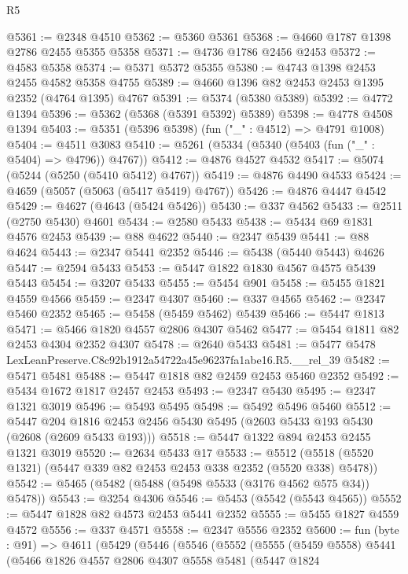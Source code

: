 \begin{lexlean}{R5}
\begin{coremodule}
@5361 := @2348 @4510
@5362 := @5360 @5361
@5368 := @4660 @1787 @1398 @2786 @2455 @5355 @5358
@5371 := @4736 @1786 @2456 @2453
@5372 := @4583 @5358
@5374 := @5371 @5372 @5355
@5380 := @4743 @1398 @2453 @2455 @4582 @5358 @4755
@5389 := @4660 @1396 @82 @2453 @2453 @1395 @2352 (@4764 @1395) @4767
@5391 := @5374 (@5380 @5389)
@5392 := @4772 @1394
@5396 := @5362 (@5368 (@5391 @5392) @5389)
@5398 := @4778 @4508 @1394
@5403 := @5351 (@5396 @5398) (fun ("_" : @4512) => @4791 @1008)
@5404 := @4511 @3083
@5410 := @5261 (@5334 (@5340 (@5403 (fun ("_" : @5404) => @4796)) @4767))
@5412 := @4876 @4527 @4532
@5417 := @5074 (@5244 (@5250 (@5410 @5412) @4767))
@5419 := @4876 @4490 @4533
@5424 := @4659 (@5057 (@5063 (@5417 @5419) @4767))
@5426 := @4876 @4447 @4542
@5429 := @4627 (@4643 (@5424 @5426))
@5430 := @337 @4562
@5433 := @2511 (@2750 @5430) @4601
@5434 := @2580 @5433
@5438 := @5434 @69 @1831 @4576 @2453
@5439 := @88 @4622
@5440 := @2347 @5439
@5441 := @88 @4624
@5443 := @2347 @5441 @2352
@5446 := @5438 (@5440 @5443) @4626
@5447 := @2594 @5433
@5453 := @5447 @1822 @1830 @4567 @4575 @5439 @5443
@5454 := @3207 @5433
@5455 := @5454 @901
@5458 := @5455 @1821 @4559 @4566
@5459 := @2347 @4307
@5460 := @337 @4565
@5462 := @2347 @5460 @2352
@5465 := @5458 (@5459 @5462) @5439
@5466 := @5447 @1813
@5471 := @5466 @1820 @4557 @2806 @4307 @5462
@5477 := @5454 @1811 @82 @2453 @4304 @2352 @4307
@5478 := @2640 @5433
@5481 := @5477 @5478 LexLeanPreserve.C8c92b1912a54722a45e96237fa1abe16.R5.__rel_39
@5482 := @5471 @5481
@5488 := @5447 @1818 @82 @2459 @2453 @5460 @2352
@5492 := @5434 @1672 @1817 @2457 @2453
@5493 := @2347 @5430
@5495 := @2347 @1321 @3019
@5496 := @5493 @5495
@5498 := @5492 @5496 @5460
@5512 := @5447
    @204
    @1816
    @2453
    @2456
    @5430
    @5495
    (@2603 @5433 @193 @5430 (@2608 (@2609 @5433 @193)))
@5518 := @5447 @1322 @894 @2453 @2455 @1321 @3019
@5520 := @2634 @5433 @17
@5533 := @5512 (@5518 (@5520 @1321) (@5447 @339 @82 @2453 @2453 @338 @2352 (@5520 @338) @5478))
@5542 := @5465 (@5482 (@5488 (@5498 @5533 (@3176 @4562 @575 @34)) @5478))
@5543 := @3254 @4306
@5546 := @5453 (@5542 (@5543 @4565))
@5552 := @5447 @1828 @82 @4573 @2453 @5441 @2352
@5555 := @5455 @1827 @4559 @4572
@5556 := @337 @4571
@5558 := @2347 @5556 @2352
@5600 := fun (byte : @91) =>
  @4611
    (@5429
      (@5446
        (@5546
          (@5552
            (@5555
              (@5459 @5558)
              @5441
              (@5466
                @1826
                @4557
                @2806
                @4307
                @5558
                @5481
                (@5447
                  @1824

\end{coremodule}
\end{lexlean}
